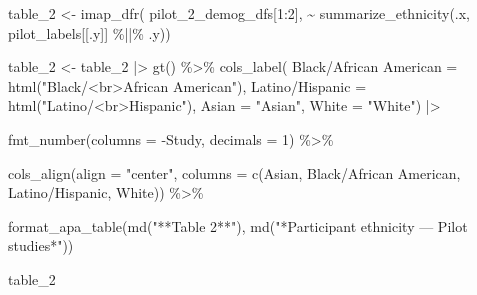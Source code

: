 \documentclass[
  man]{apa7}
\newenvironment{Shaded}{\begin{snugshade}}{\end{snugshade}}
\newcommand{\AttributeTok}[1]{\textcolor[rgb]{0.40,0.45,0.13}{#1}}
\newcommand{\DecValTok}[1]{\textcolor[rgb]{0.68,0.00,0.00}{#1}}
\newcommand{\FunctionTok}[1]{\textcolor[rgb]{0.28,0.35,0.67}{#1}}
\newcommand{\NormalTok}[1]{\textcolor[rgb]{0.00,0.23,0.31}{#1}}
\newcommand{\OtherTok}[1]{\textcolor[rgb]{0.00,0.23,0.31}{#1}}
\newcommand{\SpecialCharTok}[1]{\textcolor[rgb]{0.37,0.37,0.37}{#1}}
\newcommand{\StringTok}[1]{\textcolor[rgb]{0.13,0.47,0.30}{#1}}
\begin{document}
\begin{Shaded}
\begin{Highlighting}[]
\NormalTok{table\_2 }\OtherTok{\textless{}{-}} \FunctionTok{imap\_dfr}\NormalTok{(}
\NormalTok{  pilot\_2\_demog\_dfs[}\DecValTok{1}\SpecialCharTok{:}\DecValTok{2}\NormalTok{], }
  \SpecialCharTok{\textasciitilde{}} \FunctionTok{summarize\_ethnicity}\NormalTok{(.x, pilot\_labels[[.y]] }\SpecialCharTok{\%||\%}\NormalTok{ .y)) }

\NormalTok{table\_2 }\OtherTok{\textless{}{-}}\NormalTok{ table\_2 }\SpecialCharTok{|\textgreater{}}
  \FunctionTok{gt}\NormalTok{() }\SpecialCharTok{\%\textgreater{}\%}
  \FunctionTok{cols\_label}\NormalTok{(}
    \StringTok{\textasciigrave{}}\AttributeTok{Black/African American}\StringTok{\textasciigrave{}} \OtherTok{=} \FunctionTok{html}\NormalTok{(}\StringTok{"Black/\textless{}br\textgreater{}African American"}\NormalTok{),}
    \StringTok{\textasciigrave{}}\AttributeTok{Latino/Hispanic}\StringTok{\textasciigrave{}}        \OtherTok{=} \FunctionTok{html}\NormalTok{(}\StringTok{"Latino/\textless{}br\textgreater{}Hispanic"}\NormalTok{),}
    \AttributeTok{Asian                    =} \StringTok{"Asian"}\NormalTok{,}
    \AttributeTok{White                    =} \StringTok{"White"}\NormalTok{) }\SpecialCharTok{|\textgreater{}}
  
  \FunctionTok{fmt\_number}\NormalTok{(}\AttributeTok{columns =} \SpecialCharTok{{-}}\NormalTok{Study, }\AttributeTok{decimals =} \DecValTok{1}\NormalTok{) }\SpecialCharTok{\%\textgreater{}\%}
  
  \FunctionTok{cols\_align}\NormalTok{(}\AttributeTok{align =} \StringTok{"center"}\NormalTok{, }
             \AttributeTok{columns =} \FunctionTok{c}\NormalTok{(Asian, }\StringTok{\textasciigrave{}}\AttributeTok{Black/African American}\StringTok{\textasciigrave{}}\NormalTok{, }
                         \StringTok{\textasciigrave{}}\AttributeTok{Latino/Hispanic}\StringTok{\textasciigrave{}}\NormalTok{, White)) }\SpecialCharTok{\%\textgreater{}\%}
  
\FunctionTok{format\_apa\_table}\NormalTok{(}\FunctionTok{md}\NormalTok{(}\StringTok{"**Table 2**"}\NormalTok{), }\FunctionTok{md}\NormalTok{(}\StringTok{"*Participant ethnicity — Pilot studies*"}\NormalTok{))}

\NormalTok{table\_2}
\end{Highlighting}
\end{Shaded}
\end{document}
